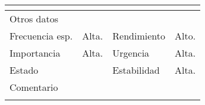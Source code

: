 \documentclass{article}
\begin{document}
\begin{table}[h]
\begin{tabular}{|l|l|l|l|l|l|}
\hline
\multicolumn{1}{|p{1cm}}{} & \multicolumn{5}{|p{9cm}|}{}\\
\hline
\multicolumn{6}{|p{10cm}|}{Otros datos}\\
\hline
\multicolumn{1}{|p{2cm}|}{Frecuencia esp.} & \multicolumn{2}{p{3cm}}{Alta.} & \multicolumn{1}{|p{2cm}|}{Rendimiento} & \multicolumn{2}{p{3cm}|}{Alto.}\\
\hline
\multicolumn{1}{|p{2cm}|}{Importancia} & \multicolumn{2}{p{3cm}}{Alta.} & \multicolumn{1}{|p{2cm}|}{Urgencia} & \multicolumn{2}{p{3cm}|}{Alta.}\\
\hline
\multicolumn{1}{|p{2cm}|}{Estado} & \multicolumn{2}{p{3cm}}{} & \multicolumn{1}{|p{2cm}|}{Estabilidad} & \multicolumn{2}{p{3cm}|}{Alta.}\\
\hline
\multicolumn{6}{|p{10cm}|}{Comentario}\\
\hline
\multicolumn{6}{|p{10cm}|}{}\\
\hline
\end{tabular}
\end{table}
\addtocounter{ni}{1}
\clearpage
\end{document}
